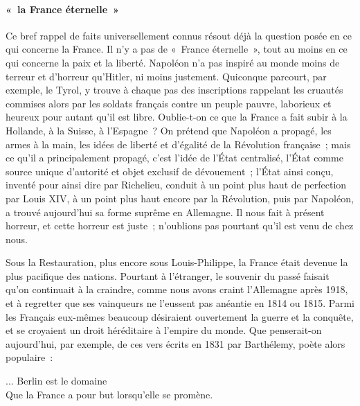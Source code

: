 \documentclass[french,twoside]{book} %
\newenvironment{quoteblock}%
  {\begin{quoting}}
  {\end{quoting}}
\newenvironment{quotebar}{%
    \def\FrameCommand{{\color{rubric!10!}\vrule width 0.5em} \hspace{0.9em}}%
    \def\OuterFrameSep{\itemsep} %
    \MakeFramed {\advance\hsize-\width \FrameRestore}
  }%
  {%
    \endMakeFramed
  }
\renewenvironment{quoteblock}%
  {%
    \savenotes
    \setstretch{0.9}
    \normalfont
    \begin{quotebar}
  }
  {%
    \end{quotebar}
    \spewnotes
  }
\begin{document}
\paragraph[{« la France éternelle »}]{« la France éternelle »}
\noindent Ce bref rappel de faits universellement connus résout déjà la question posée en ce qui concerne la France. Il n'y a pas de « France éternelle », tout au moins en ce qui concerne la paix et la liberté. Napoléon n'a pas inspiré au monde moins de terreur et d'horreur qu'Hitler, ni moins justement. Quiconque parcourt, par exemple, le Tyrol, y trouve à chaque pas des inscriptions rappe­lant les cruautés commises alors par les soldats français contre un peuple pauvre, laborieux et heureux pour autant qu'il est libre. Oublie-t-on ce que la France a fait subir à la Hollande, à la Suisse, à l'Espagne ? On prétend que Napoléon a propagé, les armes à la main, les idées de liberté et d'égalité de la Révolution française ; mais ce qu'il a principalement propagé, c'est l'idée de l'État centralisé, l'État comme source unique d'autorité et objet exclusif de dévouement ; l'État ainsi conçu, inventé pour ainsi dire par Richelieu, conduit à un point plus haut de perfection par Louis XIV, à un point plus haut encore par la Révolution, puis par Napoléon, a trouvé aujourd'hui sa forme suprême en Allemagne. Il nous fait à présent horreur, et cette horreur est juste ; n'oublions pas pourtant qu'il est venu de chez nous.\par
Sous la Restauration, plus encore sous Louis-Philippe, la France était de­venue la plus pacifique des nations. Pourtant à l'étranger, le souvenir du passé faisait qu'on continuait à la craindre, comme nous avons craint l'Allemagne après 1918, et à regretter que ses vainqueurs ne l'eussent pas anéantie en 1814 ou 1815. Parmi les Français eux-mêmes beaucoup désiraient ouvertement la guerre et la conquête, et se croyaient un droit héréditaire à l'empire du monde. Que penserait-on aujourd'hui, par exemple, de ces vers écrits en 1831 par Barthélemy, poète alors populaire :\par

\begin{quoteblock}
 \noindent ... Berlin est le domaine \\
Que la France a pour but lorsqu'elle se promène.
 \end{quoteblock}
\end{document}
